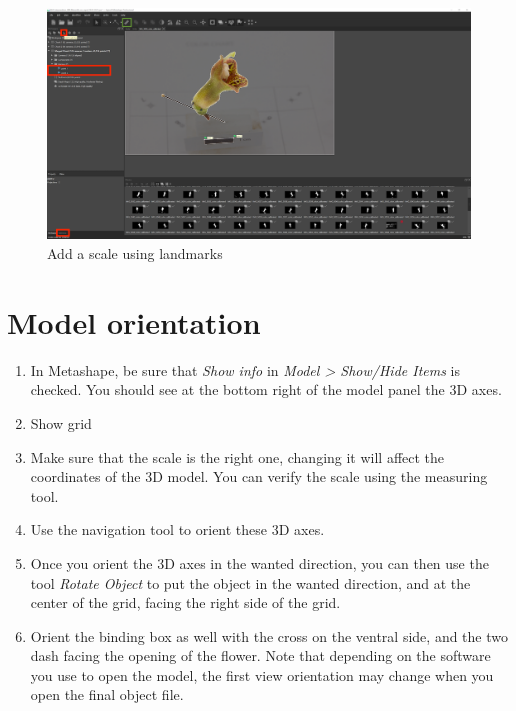 \documentclass[
]{book}
\begin{document}
\begin{figure}

{\centering \includegraphics[width=1\linewidth]{Figures/metashape_add_scale_2} 

}

\caption{Add a scale using landmarks}\label{fig:addscale}
\end{figure}

\hypertarget{model-orientation}{%
\section{Model orientation}\label{model-orientation}}

\begin{enumerate}
\def\labelenumi{\arabic{enumi}.}
\item
  In Metashape, be sure that \emph{Show info} in \emph{Model \textgreater{} Show/Hide Items}
  is checked. You should see at the bottom right of the model panel
  the 3D axes.
\item
  Show grid
\item
  Make sure that the scale is the right one, changing it will affect
  the coordinates of the 3D model. You can verify the scale using the
  measuring tool.
\item
  Use the navigation tool to orient these 3D axes.
\item
  Once you orient the 3D axes in the wanted direction, you can then
  use the tool \emph{Rotate Object} to put the object in the wanted
  direction, and at the center of the grid, facing the right side of
  the grid.
\item
  Orient the binding box as well with the cross on the ventral side,
  and the two dash facing the opening of the flower. Note that
  depending on the software you use to open the model, the first view
  orientation may change when you open the final object file.
\end{enumerate}
\end{document}
